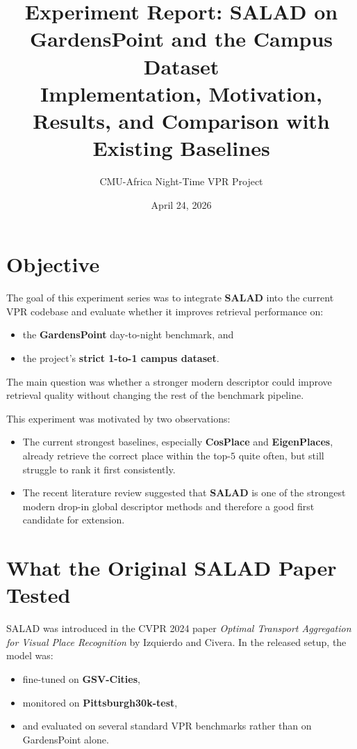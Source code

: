 \documentclass[11pt]{article}
\title{\textbf{Experiment Report: SALAD on GardensPoint and the Campus Dataset}\\[4pt]
Implementation, Motivation, Results, and Comparison with Existing Baselines}
\author{CMU-Africa Night-Time VPR Project}
\date{April 24, 2026}
\begin{document}
\maketitle

\section*{Objective}
The goal of this experiment series was to integrate \textbf{SALAD} into the current VPR codebase and evaluate whether it improves retrieval performance on:
\begin{itemize}[leftmargin=*]
  \item the \textbf{GardensPoint} day-to-night benchmark, and
  \item the project's \textbf{strict 1-to-1 campus dataset}.
\end{itemize}

The main question was whether a stronger modern descriptor could improve retrieval quality without changing the rest of the benchmark pipeline.

This experiment was motivated by two observations:
\begin{itemize}[leftmargin=*]
  \item The current strongest baselines, especially \textbf{CosPlace} and \textbf{EigenPlaces}, already retrieve the correct place within the top-$5$ quite often, but still struggle to rank it first consistently.
  \item The recent literature review suggested that \textbf{SALAD} is one of the strongest modern drop-in global descriptor methods and therefore a good first candidate for extension.
\end{itemize}

\section*{What the Original SALAD Paper Tested}
SALAD was introduced in the CVPR 2024 paper \textit{Optimal Transport Aggregation for Visual Place Recognition} by Izquierdo and Civera. In the released setup, the model was:
\begin{itemize}[leftmargin=*]
  \item fine-tuned on \textbf{GSV-Cities},
  \item monitored on \textbf{Pittsburgh30k-test},
  \item and evaluated on several standard VPR benchmarks rather than on GardensPoint alone.
\end{itemize}
\end{document}
